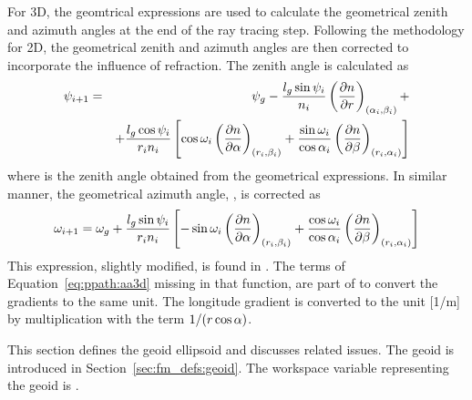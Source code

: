 \label{sec:ppath:refr3D}
For 3D, the geomtrical expressions are used to
calculate the geometrical zenith and azimuth angles at the end of the
ray tracing step. Following the methodology for 2D, the geometrical
zenith and azimuth angles are then corrected to incorporate the
influence of refraction. The zenith angle is calculated as
\begin{eqnarray}
  \psi_{i+1} &=& \psi_{g} - \frac{l_g\sin\psi_{i}}{n_i} 
     \left( \frac{\partial n}{\partial r} \right)_{(\alpha_{i},\beta_{i})} + \\
     & &  + \frac{l_g\cos\psi_{i}}{r_{i}n_i}
   \left[
     \cos\omega_{i} 
          \left( \frac{\partial n}{\partial \alpha} \right)_{(r_{i},\beta_{i})}
    +\frac{\sin\omega_{i}}{\cos\alpha_{i}} 
          \left( \frac{\partial n}{\partial \beta} \right)_{(r_{i},\alpha_{i})}
  \right]  \nonumber
  \label{eq:ppath:za3d} 
\end{eqnarray}
where  is the zenith angle obtained from the geometrical
expressions. In similar manner, the geometrical azimuth angle,
, is corrected as
\begin{equation}
  \omega_{i+1} = \omega_{g} + \frac{l_g\sin\psi_{i}}{r_in_i} 
   \left[
    -\sin\omega_{i} 
          \left( \frac{\partial n}{\partial \alpha} \right)_{(r_{i},\beta_{i})}
    +\frac{\cos\omega_{i}}{\cos\alpha_{i}}
          \left( \frac{\partial n}{\partial \beta} \right)_{(r_{i},\alpha_{i})}
  \right]  
  \label{eq:ppath:aa3d} 
\end{equation}
This expression, slightly modified, is found in
. The terms of
Equation~\ref{eq:ppath:aa3d} missing in that function, are part of
 to convert the gradients to the same
unit. The longitude gradient is converted to the unit [1/m] by
multiplication with the term $1/(r\cos\alpha)$.




\label{sec:ppath:geoids}

This section defines the geoid ellipsoid and discusses related
issues. The geoid is introduced in Section~\ref{sec:fm_defs:geoid}.
The workspace variable representing the geoid is .


\label{sec:ppath:geoid}

